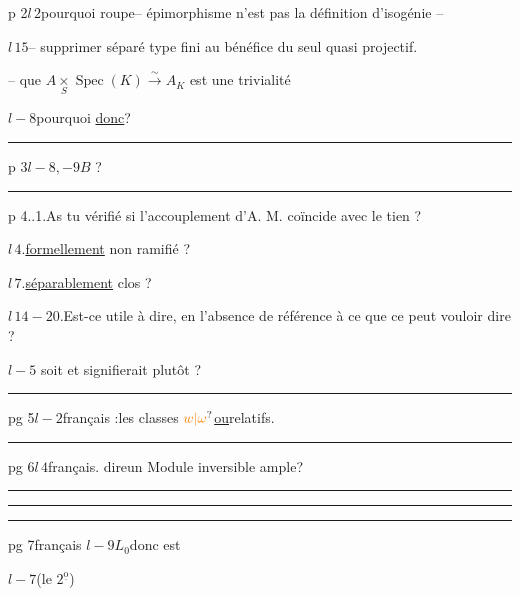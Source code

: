 p 2\quad $l\,2$\qquad pourquoi roupe\qquad -- épimorphisme n'est pas la définition d'isogénie --

$l\,15$\qquad -- supprimer séparé type fini au bénéfice du seul quasi projectif.

-- que $A\mathbin{\mathop{\times}\limits_S}\operatorname{Spec}(K)\overset{\sim}{\longrightarrow}A_K$ est une trivialité


$l-8$\qquad pourquoi \uline{donc}\qquad ?

\hrule

p 3\quad $l-8,-9$\qquad $B$ ?

\hrule

p 4..1.\qquad As tu vérifié si l'accouplement d'A. M. coïncide avec le tien ?

$l\,4$.\qquad \uline{formellement} non ramifié ?

$l\,7$.\qquad \uline{séparablement} clos ?

$l\,14-20$.\quad Est-ce utile à dire, en l'absence de référence à ce que ce peut vouloir dire ?

$l-5$\qquad {} soit \qquad et \qquad signifierait \qquad plutôt ?

\hrule

pg 5\quad $l-2$\qquad français :\quad les classes $\unsure{w|\omega}$\qquad \uline{ou}\qquad relatifs.

\hrule

pg 6\quad $l\,4$\qquad français. dire\qquad un Module inversible ample\qquad ?


\hrule\smallskip\hrule\smallskip\hrule


pg 7\qquad français \uline{$l-9$}\quad {}$L_0$\quad donc  est

\quad $l-7$\quad {}\quad (le $2^{\underline{\mathrm o}}$)


